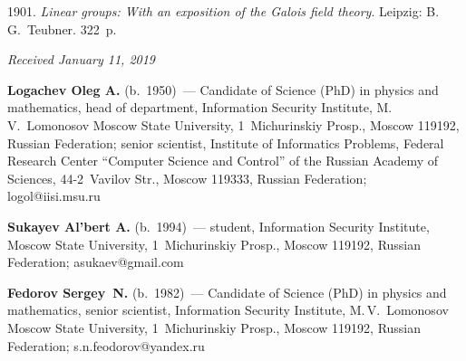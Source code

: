 \begin{multicols}{2}
{{\begin{thebibliography}{99}
 1901. \textit{Linear groups: 
With an exposition of the Galois field theory}. Leipzig: B.\,G.~Teubner. 322~p.
\end{thebibliography}

 }
 }

\end{multicols}

\vspace*{-6pt}

\hfill{\small\textit{Received January 11, 2019}}



\Contr

\noindent
\textbf{Logachev Oleg A.} (b.\ 1950)~--- 
Candidate of Science (PhD) in physics and mathematics, head of department, 
Information Security Institute, M.\,V.~Lomonosov Moscow State University, 
1~Michurinskiy Prosp., Moscow 119192, Russian Federation; 
senior scientist, Institute of Informatics Problems, 
Federal Research Center ``Computer Science and Control'' 
of the Russian Academy of Sciences, 44-2~Vavilov Str., Moscow 119333, 
Russian Federation; \mbox{logol@iisi.msu.ru }

 



\vspace*{3pt}

\noindent
\textbf{Sukayev Al'bert A.} (b.\ 1994)~--- 
student, Information Security Institute, Moscow State University, 
1~Michurinskiy Prosp., Moscow 119192, Russian Federation; 
\mbox{asukaev@gmail.com}

\vspace*{3pt}

\noindent
\textbf{Fedorov Sergey~N.} (b.\ 1982)~--- 
Candidate of Science (PhD) in physics and mathematics, senior scientist, 
Information Security Institute, M.\,V.~Lomonosov Moscow State University, 
1~Michurinskiy Prosp., Moscow 119192, Russian Federation; 
\mbox{s.n.feodorov@yandex.ru}
\label{end\stat}

\renewcommand{\bibname}{\protect\rm Литература}       